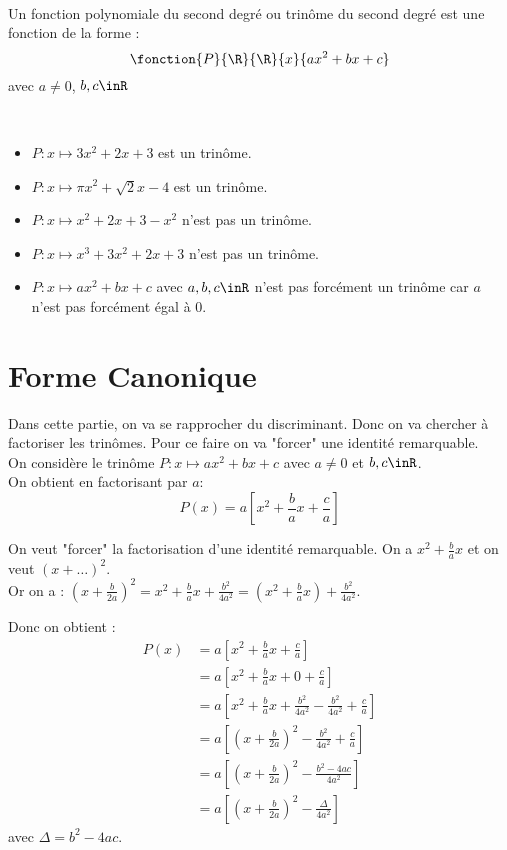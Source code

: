 \documentclass[12pt,fleqn]{report} %
\begin{document}
\begin{definition}\text{ }\\
	Un fonction polynomiale du second degré ou trinôme du second degré est une fonction de la forme :
	\[
	\fonction{P}{\R}{\R}{x}{ax^2 + bx + c}
	\]
	avec $a \neq 0$, $b,c \inR$
\end{definition}
\begin{example}\text{ }\\
	\begin{itemize}
		\item $P: x \mapsto 3x^2  + 2x +3$ est un trinôme.
		\item $P : x \mapsto \pi x^2  + \sqrt{2}x - 4$ est un trinôme.
		\item $P : x \mapsto x^2  + 2x +3 - x^2$ n'est pas un trinôme.
		\item $P : x \mapsto x^3+ 3x^2  + 2x +3$ n'est pas un trinôme.
		\item $P : x \mapsto ax^2 + bx + c$ avec $a,b,c \inR$ n'est pas forcément un trinôme car $a$ n'est pas forcément égal à 0.
	\end{itemize}
\end{example}

\section{Forme Canonique}
Dans cette partie, on va se rapprocher du discriminant. Donc on va chercher à factoriser les trinômes. Pour ce faire on va "forcer" une identité remarquable.\\
On considère le trinôme $P : x \mapsto ax^2 + bx + c$ avec $a\neq 0$ et $b,c\inR$. \\On obtient en factorisant par $a$: 
\[
P(x) = a \left[x^2 + \frac{b}{a}x + \frac{c}{a} \right]
\]

On veut "forcer" la factorisation d'une identité remarquable. On a $x^2 + \frac{b}{a}x$ et on veut $\left(x + \dots\right)^2$.\\ 
Or on a : $\left(x + \frac{b}{2a}\right)^2 = x^2 + \frac{b}{a}x + \frac{b^2}{4a^2} = \left(x^2 + \frac{b}{a}x \right)+ \frac{b^2}{4a^2}.$

Donc on obtient : \begin{align*}
P(x) & =  a \left[x^2 + \frac{b}{a}x + \frac{c}{a} \right] \\ 
& = a \left[x^2 +\frac{b}{a}x + 0 + \frac{c}{a}\right] \\ 
& = a \left[x^2 +\frac{b}{a}x + \frac{b^2}{4a^2} - \frac{b^2}{4a^2} + \frac{c}{a}\right] \\
& = a \left[\left(x + \frac{b}{2a}\right)^2 - \frac{b^2}{4a^2} + \frac{c}{a} \right] \\
& = a \left[\left(x + \frac{b}{2a}\right)^2 - \frac{b^2 - 4ac}{4a^2} \right] \\
& = a \left[\left(x + \frac{b}{2a}\right)^2 - \frac{\Delta}{4a^2} \right]
\end{align*}
avec $\Delta = b^2 - 4ac$.
\end{document}
